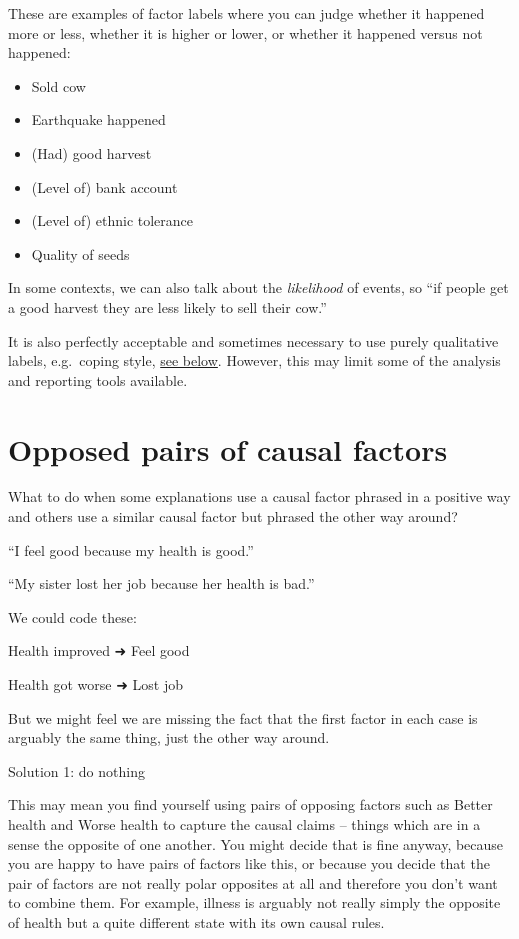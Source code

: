 \documentclass[
]{book}
\providecommand{\tightlist}{%
  \setlength{\itemsep}{0pt}\setlength{\parskip}{0pt}}
\begin{document}
These are examples of factor labels where you can judge whether it happened more or less, whether it is higher or lower, or whether it happened versus not happened:

\begin{itemize}
\tightlist
\item
  Sold cow
\item
  Earthquake happened
\item
  (Had) good harvest
\item
  (Level of) bank account
\item
  (Level of) ethnic tolerance
\item
  Quality of seeds
\end{itemize}

In some contexts, we can also talk about the \emph{likelihood} of events, so ``if people get a good harvest they are less likely to sell their cow.''

It is also perfectly acceptable and sometimes necessary to use purely qualitative labels, e.g.~coping style, \href{https://guide.causalmap.app/creating.html\#examples-of-non-quantitative-factors}{see below}. However, this may limit some of the analysis and reporting tools available.

\hypertarget{opposed-pairs-of-causal-factors}{%
\section{Opposed pairs of causal factors}\label{opposed-pairs-of-causal-factors}}

What to do when some explanations use a causal factor phrased in a positive way and others use a similar causal factor but phrased the other way around?

``I feel good because my health is good.''

``My sister lost her job because her health is bad.''

We could code these:

Health improved ➜ Feel good

Health got worse ➜ Lost job

But we might feel we are missing the fact that the first factor in each case is arguably the same thing, just the other way around.

Solution 1: do nothing

This may mean you find yourself using pairs of opposing factors such as Better health and Worse health to capture the causal claims -- things which are in a sense the opposite of one another. You might decide that is fine anyway, because you are happy to have pairs of factors like this, or because you decide that the pair of factors are not really polar opposites at all and therefore you don't want to combine them. For example, illness is arguably not really simply the opposite of health but a quite different state with its own causal rules.
\end{document}
